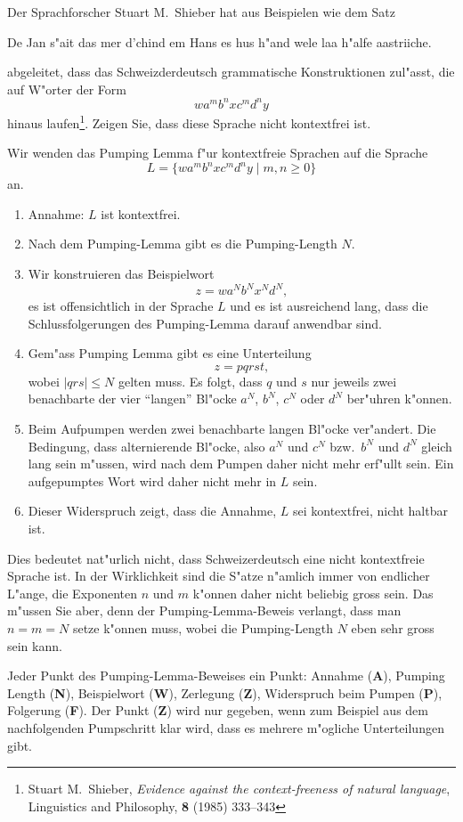 Der Sprachforscher Stuart M.~Shieber hat aus Beispielen wie dem Satz
\begin{center}
De Jan s"ait das mer d'chind em Hans es hus h"and wele laa h"alfe aastriiche.
\end{center}
abgeleitet, dass das Schweizderdeutsch grammatische Konstruktionen
zul"asst, die auf W"orter der Form
\[
wa^mb^nxc^md^ny
\]
hinaus laufen\footnote{Stuart M.~Shieber,
{\em Evidence against the context-freeness of natural language},
Linguistics and Philosophy, {\bf 8} (1985) 333--343}.
Zeigen Sie, dass diese Sprache nicht kontextfrei ist.

\begin{loesung}
Wir wenden das Pumping Lemma f"ur kontextfreie Sprachen auf die Sprache
\[
L=\{
wa^mb^nxc^md^ny
\;|\; m,n\ge 0
\}
\]
an.
\begin{enumerate}
\item Annahme: $L$ ist kontextfrei.
\item Nach dem Pumping-Lemma gibt es die Pumping-Length $N$.
\item Wir konstruieren das Beispielwort
\[
z=wa^Nb^Nx^Nd^N,
\]
es ist offensichtlich in der Sprache $L$
und es ist ausreichend lang, dass die Schlussfolgerungen des Pumping-Lemma
darauf anwendbar sind.
\item
Gem"ass Pumping Lemma gibt es eine Unterteilung
\[
z=pqrst,
\]
wobei $|qrs|\le N$ gelten muss.
Es folgt, dass $q$ und $s$ nur jeweils zwei benachbarte der
vier ``langen'' Bl"ocke $a^N$, $b^N$, $c^N$ oder $d^N$ ber"uhren k"onnen.
\item 
Beim Aufpumpen werden zwei benachbarte langen Bl"ocke ver"andert.
Die Bedingung, dass alternierende Bl"ocke, also $a^N$ und $c^N$
bzw.~$b^N$ und $d^N$ gleich lang sein m"ussen, wird nach dem Pumpen
daher nicht mehr erf"ullt sein.
Ein aufgepumptes Wort wird daher nicht mehr in $L$ sein.
\item Dieser Widerspruch zeigt, dass die Annahme, $L$ sei kontextfrei,
nicht haltbar ist.
\end{enumerate}
\end{loesung}

\begin{diskussion}
Dies bedeutet nat"urlich nicht, dass Schweizerdeutsch eine nicht
kontextfreie Sprache ist.
In der Wirklichkeit sind die S"atze n"amlich immer von endlicher L"ange,
die Exponenten $n$ und $m$ k"onnen daher nicht beliebig gross sein.
Das m"ussen Sie aber, denn der Pumping-Lemma-Beweis verlangt, dass man
$n=m=N$ setze k"onnen muss, wobei die Pumping-Length $N$ eben sehr gross
sein kann.
\end{diskussion}

\begin{bewertung}
Jeder Punkt des Pumping-Lemma-Beweises ein Punkt:
Annahme ({\bf A}), Pumping Length ({\bf N}), Beispielwort ({\bf W}),
Zerlegung ({\bf Z}), Widerspruch beim Pumpen ({\bf P}), 
Folgerung ({\bf F}).
Der Punkt ({\bf Z}) wird nur gegeben, wenn zum Beispiel aus dem nachfolgenden
Pumpschritt klar wird, dass es mehrere m"ogliche Unterteilungen gibt.
\end{bewertung}

